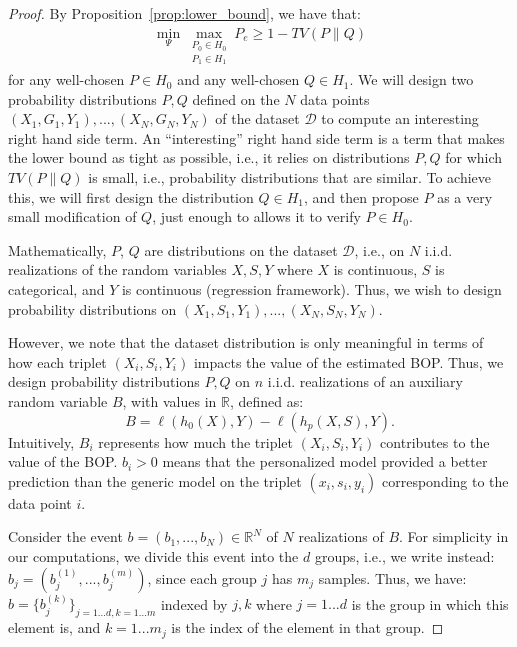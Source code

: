 \begin{proof}
    By Proposition~\ref{prop:lower_bound}, we have that:
 \begin{align*}
    \min _{\Psi} 
    \max _{\substack{P_0 \in H_0 \\ P_1 \in H_1}}
        P_e 
        \geq 
        1 - TV(P\parallel Q)
        \end{align*}
for any well-chosen $P \in H_0$ and any well-chosen $Q \in H_1$. We will design two probability distributions $P, Q$ defined on the $N$ data points $(X_1, G_1, Y_1), ..., (X_N, G_N, Y_N)$ of the dataset $\mathcal{D}$ to compute an interesting right hand side term. An ``interesting'' right hand side term is a term that makes the lower bound as tight as possible, i.e., it relies on distributions $P, Q$ for which $TV(P\parallel Q)$ is small, i.e., probability distributions that are similar. To achieve this, we will first design the distribution $Q \in H_1$, and then propose $P$ as a very small modification of $Q$, just enough to allows it to verify $P \in H_0$.


Mathematically, $P$, $Q$ are distributions on the dataset $\mathcal{D}$, i.e., on $N$ i.i.d. realizations of the random variables $X, S, Y$ where $X$ is continuous, $S$ is categorical, and $Y$ is continuous (regression framework). Thus, we wish to design probability distributions on $(X_1, S_1, Y_1), ..., (X_N, S_N, Y_N)$.

However, we note that the dataset distribution is only meaningful in terms of how each triplet $(X_i, S_i, Y_i)$ impacts the value of the estimated BOP. Thus, we design probability distributions $P, Q$ on $n$ i.i.d. realizations of an auxiliary random variable $B$, with values in $\mathbb{R}$, defined as:
\begin{equation}
    B = \ell(h_0(X), Y) - \ell(h_p(X, S), Y).
\end{equation}
Intuitively, $B_i$ represents how much the triplet $(X_i, S_i, Y_i)$ contributes to the value of the BOP. $b_i > 0$ means that the personalized model provided a better prediction than the generic model on the triplet $(x_i, s_i, y_i)$ corresponding to the data point $i$.

Consider the event $b = (b_1, ..., b_N) \in \mathbb{R}^N$ of $N$ realizations of $B$. For simplicity in our computations, we divide this event into the $d$ groups, i.e., we write instead: $b_j = (b_j^{(1)}, ..., b_j^{(m)})$, since each group $j$ has $m_j$ samples. Thus, we have: $b = \{b_j^{(k)}\}_{j=1...d, k=1...m}$ indexed by $j, k$ where $j=1...d$ is the group in which this element is, and $k=1...m_j$ is the index of the element in that group.


\end{proof}
